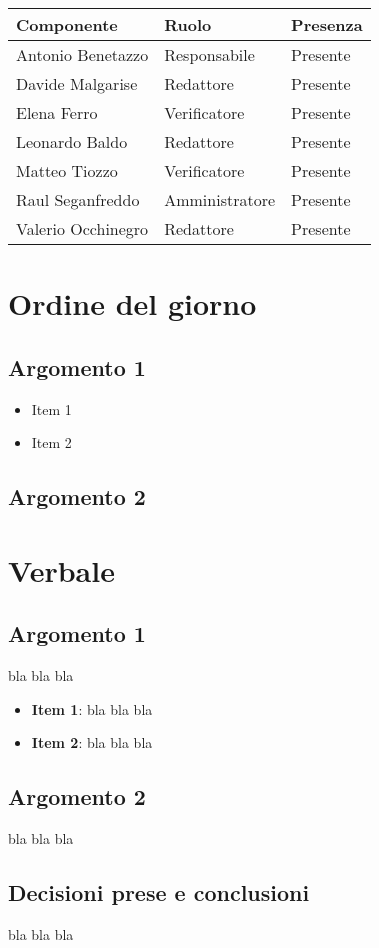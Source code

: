 \documentclass[italian,12pt]{article} %
\begin{document}
\begin{flushleft}
	\begin{table}[!h]
	\begin{tabular}{ |l|l|l| } 
		\hline
		\textbf{Componente} & \textbf{Ruolo} & \textbf{Presenza} \\
		\hline 
		Antonio Benetazzo 	& Responsabile   & Presente \\
		Davide Malgarise 	& Redattore      & Presente \\
		Elena Ferro 		& Verificatore   & Presente \\
		Leonardo Baldo 		& Redattore      & Presente \\ 
		Matteo Tiozzo 		& Verificatore   & Presente \\ 
		Raul Seganfreddo 	& Amministratore & Presente \\
		Valerio Occhinegro 	& Redattore      & Presente \\
		\hline
	\end{tabular}
	\end{table}
\end{flushleft}

\section{Ordine del giorno}
\subsection{Argomento 1}
\begin{itemize}
	\item Item 1
	\item Item 2
\end{itemize}
\subsection{Argomento 2}

\newpage

\section{Verbale}

\subsection{Argomento 1}
bla bla bla
\begin{itemize}
	\item \textbf{Item 1}: bla bla bla
	\item \textbf{Item 2}: bla bla bla
\end{itemize}

\subsection{Argomento 2}
bla bla bla

\subsection{Decisioni prese e conclusioni}
bla bla bla
\end{document}
